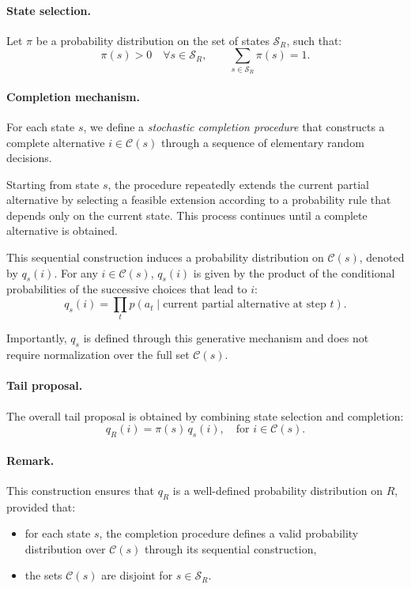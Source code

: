 \documentclass[11pt]{article}
\begin{document}
\paragraph{State selection.}
Let $\pi$ be a probability distribution on the set of states $\mathcal{S}_R$, such that:
\[
\pi(s) > 0 \quad \forall s \in \mathcal{S}_R, 
\qquad \sum_{s \in \mathcal{S}_R} \pi(s) = 1.
\]

\paragraph{Completion mechanism.}
For each state $s$, we define a \emph{stochastic completion procedure} that constructs a complete alternative $i \in \mathcal{C}(s)$ through a sequence of elementary random decisions.

Starting from state $s$, the procedure repeatedly extends the current partial alternative by selecting a feasible extension according to a probability rule that depends only on the current state. This process continues until a complete alternative is obtained.

This sequential construction induces a probability distribution on $\mathcal{C}(s)$, denoted by $q_s(i)$. For any $i \in \mathcal{C}(s)$, $q_s(i)$ is given by the product of the conditional probabilities of the successive choices that lead to $i$:
\[
q_s(i) = \prod_{t} p(a_t \mid \text{current partial alternative at step } t).
\]

Importantly, $q_s$ is defined through this generative mechanism and does not require normalization over the full set $\mathcal{C}(s)$.

\paragraph{Tail proposal.}
The overall tail proposal is obtained by combining state selection and completion:
\[
q_R(i) = \pi(s)\, q_s(i), \quad \text{for } i \in \mathcal{C}(s).
\]

\paragraph{Remark.}
This construction ensures that $q_R$ is a well-defined probability distribution on $R$, provided that:
\begin{itemize}
\item for each state $s$, the completion procedure defines a valid probability distribution over $\mathcal{C}(s)$ through its sequential construction,
\item the sets $\mathcal{C}(s)$ are disjoint for $s \in \mathcal{S}_R$.
\end{itemize}
\end{document}
